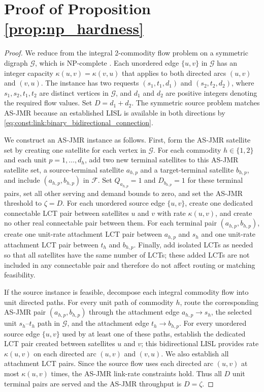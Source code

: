 \documentclass[journal]{IEEEtran}
\begin{document}
\section{Proof of Proposition \ref{prop:np_hardness}}\label{appendix:proof:prop:np_hardness}
\begin{proof}
We reduce from the integral 2-commodity flow problem on a symmetric digraph $\mathcal{G}$, which is NP-complete \cite[Theorem 1]{jarry2012multiflows}. Each unordered edge $\{u,v\}$ in $\mathcal{G}$ has an integer capacity $\kappa(u,v)=\kappa(v,u)$ that applies to both directed arcs $(u,v)$ and $(v,u)$. The instance has two requests $(s_1,t_1,d_1)$ and $(s_2,t_2,d_2)$, where $s_1,s_2,t_1,t_2$ are distinct vertices in $\mathcal{G}$, and $d_1$ and $d_2$ are positive integers denoting the required flow values. Set $D=d_1+d_2$. The symmetric source problem matches AS-JMR because an established LISL is available in both directions by \eqref{eq:const:link:binary_bidirectional_connection}.

We construct an AS-JMR instance as follows. First, form the AS-JMR satellite set by creating one satellite for each vertex in $\mathcal{G}$. For each commodity $h\in\{1,2\}$ and each unit $p=1,\dots,d_h$, add two new terminal satellites to this AS-JMR satellite set, a source-terminal satellite $a_{h,p}$ and a target-terminal satellite $b_{h,p}$, and include $(a_{h,p},b_{h,p})$ in $\mathcal{F}$. Set $Q_{a_{h,p}}=1$ and $D_{b_{h,p}}=1$ for these terminal pairs, set all other serving and demand bounds to zero, and set the AS-JMR threshold to $\zeta=D$. For each unordered source edge $\{u,v\}$, create one dedicated connectable LCT pair between satellites $u$ and $v$ with rate $\kappa(u,v)$, and create no other real connectable pair between them. For each terminal pair $(a_{h,p},b_{h,p})$, create one unit-rate attachment LCT pair between $a_{h,p}$ and $s_h$ and one unit-rate attachment LCT pair between $t_h$ and $b_{h,p}$. Finally, add isolated LCTs as needed so that all satellites have the same number of LCTs; these added LCTs are not included in any connectable pair and therefore do not affect routing or matching feasibility.

If the source instance is feasible, decompose each integral commodity flow into unit directed paths. For every unit path of commodity $h$, route the corresponding AS-JMR pair $(a_{h,p},b_{h,p})$ through the attachment edge $a_{h,p}\to s_h$, the selected unit $s_h$--$t_h$ path in $\mathcal{G}$, and the attachment edge $t_h\to b_{h,p}$. For every unordered source edge $\{u,v\}$ used by at least one of these paths, establish the dedicated LCT pair created between satellites $u$ and $v$; this bidirectional LISL provides rate $\kappa(u,v)$ on each directed arc $(u,v)$ and $(v,u)$. We also establish all attachment LCT pairs. Since the source flow uses each directed arc $(u,v)$ at most $\kappa(u,v)$ times, the AS-JMR link-rate constraints hold. Thus all $D$ unit terminal pairs are served and the AS-JMR throughput is $D=\zeta$.


\end{proof}
\end{document}
